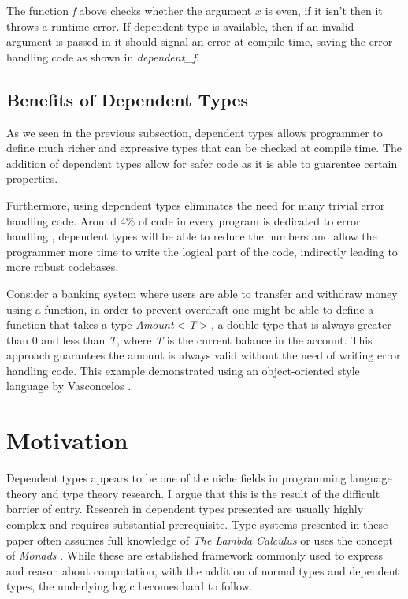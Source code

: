\documentclass[a4paper,12pt]{report}
\begin{document}
\par
The function \textit{f} above checks whether the argument $x$ is even, if it 
isn't then it throws a runtime error. If dependent type is available, then if an 
invalid argument is passed in it should signal an error at compile time, saving the 
error handling code as shown in \textit{dependent\_f}. 

\subsection{Benefits of Dependent Types}
As we seen in the previous subsection, dependent types allows programmer to 
define much richer and expressive types that can be checked at compile time. The 
addition of dependent types allow for safer code as it is able to guarentee certain 
properties. 

\par
Furthermore, using dependent types eliminates the need for many trivial error 
handling code. Around 4\% of code in every program is dedicated to error 
handling \cite{errorHandlingCode}, dependent types will be able to reduce the 
numbers and allow the programmer more time to write the logical part of the 
code, indirectly leading to more robust codebases.

\par
Consider a banking system where users are able to transfer and withdraw 
money using a function, 
in order to prevent overdraft one might be able to define a function that takes 
a type \textit{Amount$<$T$>$}, a double type that is always 
greater than 0 and less than \textit{T}, where \textit{T} is the current balance in the account. 
This approach guarantees the amount is always valid without the need of writing 
error handling code. This example demonstrated using an object-oriented style 
language by Vasconcelos \cite{objOritentedDependentType}.


\section{Motivation}
Dependent types appears to be one of the niche fields in programming language 
theory and type theory research. I argue that this is the result of the 
difficult barrier of entry. Research in dependent types presented are usually 
highly complex and requires substantial prerequisite. Type systems presented in 
these paper often assumes full knowledge of \textit{The Lambda Calculus} 
\cite{lambdaCalculus} or uses the concept of \textit{Monads} \cite{monads}. 
While these are established framework commonly used to express and reason about 
computation, with the addition of normal types and dependent types, the 
underlying logic becomes hard to follow. 
\end{document}
